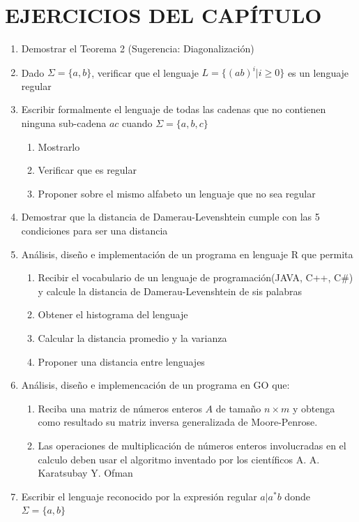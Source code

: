\section{EJERCICIOS DEL CAPÍTULO}
\begin{enumerate}
    \item Demostrar el Teorema 2 (Sugerencia: Diagonalización)
    \item Dado $\Sigma=\{a, b\}$, verificar que el lenguaje $L=\{(ab)^i|i \geq 0\}$ es un lenguaje regular
    \item Escribir formalmente el lenguaje de todas las cadenas que no contienen ninguna sub-cadena $ac$ cuando $\Sigma=\{a,b,c\}$
    \begin{enumerate}
        \item Mostrarlo
        \item Verificar que es regular
        \item Proponer sobre el mismo alfabeto un lenguaje que no sea regular
    \end{enumerate}
    \item Demostrar que la distancia de Damerau-Levenshtein cumple con las 5 condiciones para ser una distancia
    \item Análisis, diseño e implementación de un programa en lenguaje R que permita
    \begin{enumerate}
        \item Recibir el vocabulario de un lenguaje de programación(JAVA, C++, C#) y calcule la distancia de Damerau-Levenshtein de sis palabras
        \item Obtener el histograma del lenguaje
        \item Calcular la distancia promedio y la varianza
        \item Proponer una distancia entre lenguajes
    \end{enumerate}
    \item Análisis, diseño e implemencación de un programa en GO que:
    \begin{enumerate}
        \item Reciba una matriz de números enteros $A$ de tamaño $n\times m$ y obtenga como resultado su matriz inversa generalizada de Moore-Penrose.
        \item Las operaciones de multiplicación de números enteros involucradas en el calculo deben usar el algoritmo inventado por los científicos A. A. Karatsubay Y. Ofman
    \end{enumerate}
    \item Escribir el lenguaje reconocido por la expresión regular $a|a^*b$ donde $\Sigma=\{a, b\}$

\end{enumerate}
